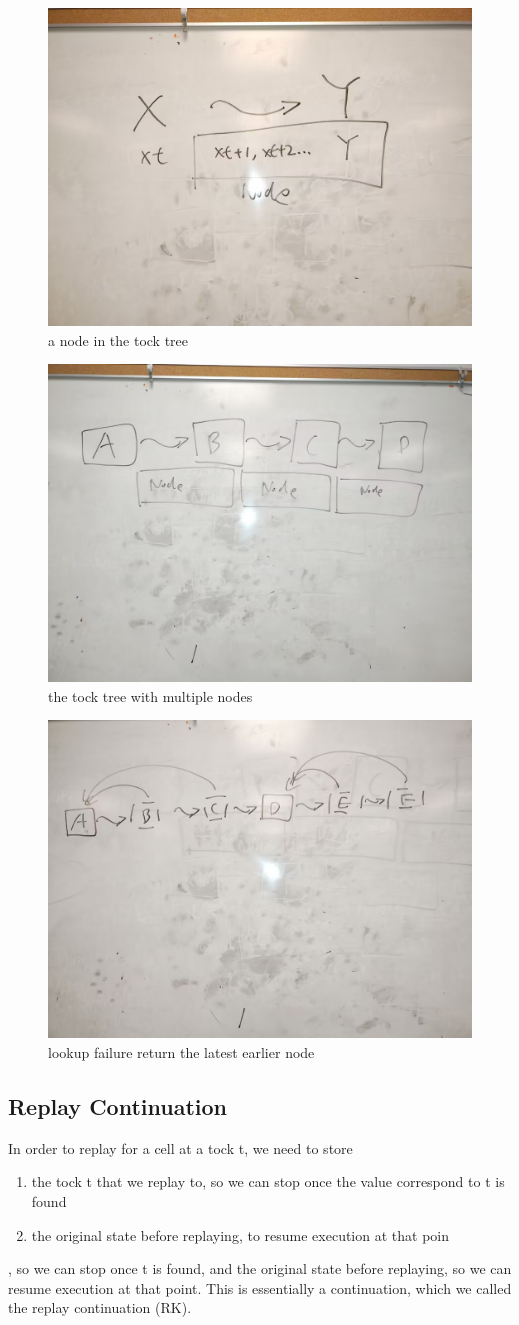 \begin{figure}
	\includegraphics[width=0.5\columnwidth]{2}
	\caption{a node in the tock tree}
\end{figure}
\begin{figure}
	\includegraphics[width=0.5\columnwidth]{3}
	\caption{the tock tree with multiple nodes}
\end{figure}

\begin{figure}
	\includegraphics[width=0.5\columnwidth]{4}
	\caption{lookup failure return the latest earlier node}
\end{figure}

\subsection{Replay Continuation}
In order to replay for a cell at a tock t, we need to store
\begin{enumerate}
	\item the tock t that we replay to, so we can stop once the value correspond to t is found
	\item the original state before replaying, to resume execution at that poin
\end{enumerate} , so we can stop once t is found, and the original state before replaying, so we can resume execution at that point. 
This is essentially a continuation, which we called the replay continuation (RK).

